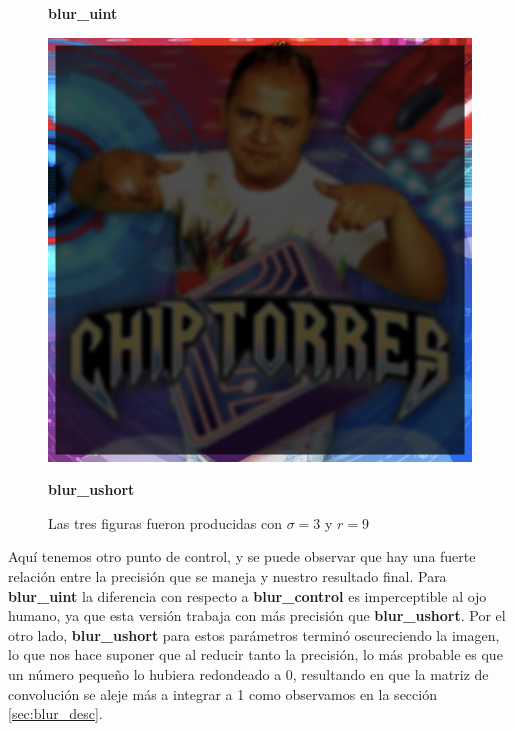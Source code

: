 \begin{figure}[H]
\begin{minipage}{.3\textwidth}
		\caption{\textbf{blur\_uint}}
		\label{fig:blur_prec_uint}
	\end{minipage}\hfill
	\begin{minipage}{.3\textwidth}
		\centering
		\includegraphics[width=\linewidth]{imgs/chip_hd_ushort.jpg}
		\caption{\textbf{blur\_ushort}}
		\label{fig:blur_prec_ushort}
	\end{minipage}
	\caption*{Las tres figuras fueron producidas con $\sigma = 3$ y $r = 9$}
\end{figure}

Aquí tenemos otro punto de control, y se puede observar que hay una fuerte
relación entre la precisión que se maneja y nuestro resultado final. Para
\textbf{blur\_uint} la diferencia con respecto a \textbf{blur\_control} es
imperceptible al ojo humano, ya que esta versión trabaja con más precisión que
\textbf{blur\_ushort}. Por el otro lado, \textbf{blur\_ushort} para estos
parámetros terminó oscureciendo la imagen, lo que nos hace suponer que al
reducir tanto la precisión, lo más probable es que un número pequeño lo hubiera
redondeado a 0, resultando en que la matriz de convolución se aleje más a
integrar a 1 como observamos en la sección \ref{sec:blur_desc}.
